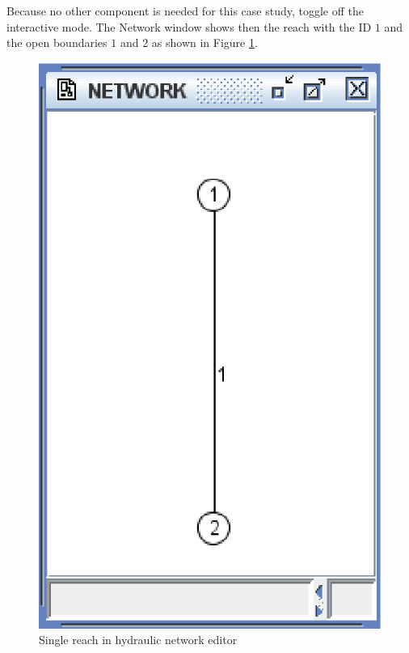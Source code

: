 \documentclass[a4paper,12pt]{article}
\begin{document}
\vspace{0.5cm}

Because no other component is needed for this case study, toggle off the
interactive mode. The Network window shows then the reach with the
ID $1$ and the open boundaries $1$ and $2$ as shown in Figure \ref{fig:Single-reach1}.

\begin{figure}[h]
  \begin{center}
  \includegraphics[scale=0.5]{single_reach}
  \caption{Single reach in hydraulic network editor}
  \label{fig:Single-reach1}
  \end{center}
\end{figure}
\end{document}
